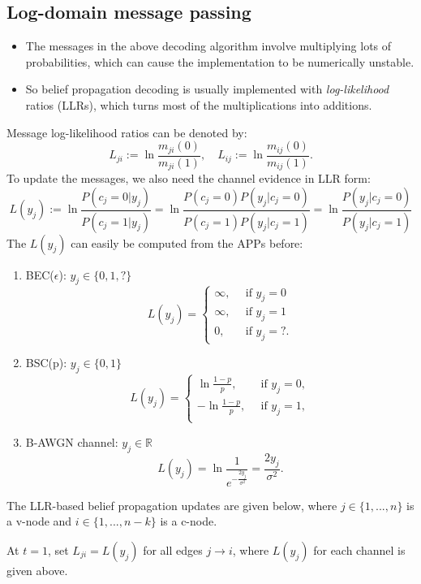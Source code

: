 \documentclass[12pt]{article}
\newcommand{\sigd}{\sigma^2}
\begin{document}
\subsection{Log-domain message passing}
\begin{itemize}
    \item The messages in the above decoding algorithm involve multiplying lots of probabilities, which can cause the implementation to be numerically unstable.
    \item So belief propagation decoding is usually implemented with \textit{log-likelihood} ratios (LLRs), which turns most of the multiplications into additions.
\end{itemize}
Message log-likelihood ratios can be denoted by:
\[
L_{ji}:=\ln\frac{m_{ji}(0)}{m_{ji}(1)}, \quad L_{ij}:=\ln\frac{m_{ij}(0)}{m_{ij}(1)}.
\]
To update the messages, we also need the channel evidence in LLR form:
\[
L(y_j):=\ln\frac{P(c_j=0|y_j)}{P(c_j=1|y_j)} = \ln\frac{P(c_j=0)P(y_j|c_j=0)}{P(c_j=1)P(y_j|c_j=1)} = \ln\frac{P(y_j|c_j=0)}{P(y_j|c_j=1)}
\]
The $L(y_j)$ can easily be computed from the APPs before:

\begin{enumerate}
    \item BEC($\epsilon$): $y_j \in \{0,1,?\}$
    \[
    L(y_j) = \left \{\begin{array}{cc} 
        \infty, & \,\textrm{  if } y_j = 0 \\
        \infty, & \,\textrm{  if } y_j  = 1 \\
        0, & \,\textrm{  if } y_j = ?.
    \end{array}
    \right.
    \]
    \item BSC(p): $y_j \in \{0,1 \}$
    \[
    L(y_j) = \left \{\begin{array}{cc} 
        \ln\frac{1-p}{p}, & \,\textrm{  if } y_j = 0, \\
        -\ln\frac{1-p}{p}, & \,\textrm{  if } y_j  = 1, \\
    \end{array}
    \right.
    \]
    \item B-AWGN channel: $y_j \in \mathbb{R}$
    \[
        L(y_j) = \ln\frac{1}{e^{-\frac{2y_j}{\sigd}}} = \frac{2y_j}{\sigd}.
    \]
\end{enumerate}

The LLR-based belief propagation updates are given below, where $j\in \{1,...,n\}$ is a v-node and $i\in\{1,...,n-k \}$ is a c-node.

At $t=1$, set $L_{ji} = L(y_j)$ for all edges $j\rightarrow i$, where $L(y_j)$ for each channel is given above.
\end{document}
